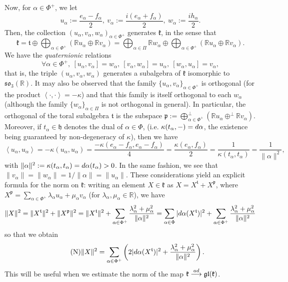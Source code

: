 \documentclass[11pt,twoside]{amsart}
\makeatletter
\theoremstyle{plain}
\newcommand{\R}{{\mathbb R}}
\newcommand{\longto}{\longrightarrow}
\newcommand{\opnorm}{\@ifstar\@opnorms\@opnorm}
\newcommand{\@opnorms}[1]{%
  \left|\mkern-1.5mu\left|\mkern-1.5mu\left|
   #1
  \right|\mkern-1.5mu\right|\mkern-1.5mu\right|
}
\newcommand{\@opnorm}[2][]{%
  \mathopen{#1|\mkern-1.5mu#1|\mkern-1.5mu#1|}
  #2
  \mathclose{#1|\mkern-1.5mu#1|\mkern-1.5mu#1|}
}
\makeatother
\begin{document}
Now, for $\alpha\in\Phi^+$, we let
\[u_\alpha:=\frac{e_\alpha-f_\alpha}{2},~v_\alpha:=\frac{i(e_\alpha+f_\alpha)}{2},~w_\alpha:=\frac{ih_\alpha}{2}.\]
Then, the collection $(u_\alpha,v_\alpha,w_\alpha)_{\alpha\in\Phi^+}$ generates $\mathfrak{k}$, in the sense that
\[\mathfrak{k}=\mathfrak{t}\oplus\bigoplus_{\alpha\in\Phi^+}(\R u_\alpha\oplus\R v_\alpha)=\bigoplus_{\alpha\in\Pi}\R w_\alpha\oplus\bigoplus_{\alpha\in\Phi^+}(\R u_\alpha\oplus\R v_\alpha).\]
We have the \textit{quaternionic} relations
\[\forall \alpha\in\Phi^+,~[u_\alpha,v_\alpha]=w_\alpha,~[v_\alpha,w_\alpha]=u_\alpha,~[w_\alpha,u_\alpha]=v_\alpha,\]
that is, the triple $(u_\alpha,v_\alpha,w_\alpha)$ generates a subalgebra of $\mathfrak{k}$ isomorphic to $\mathfrak{so}_3(\R)$. It may also be observed that the family $\{u_\alpha,v_\alpha\}_{\alpha\in\Phi^+}$ is orthogonal (for the product $\left<\cdot,\cdot\right>=-\kappa$) and that this family is itself orthogonal to each $w_\alpha$ (although the family $\{w_\alpha\}_{\alpha\in\Pi}$ is not orthogonal in general). In particular, the orthogonal of the toral subalgebra $\mathfrak{t}$ is the subspace $\mathfrak{p}:=\bigoplus^{\perp}_{\alpha\in\Phi^+}(\R u_\alpha \oplus^\perp\R v_\alpha)$. Moreover, if $t_\alpha\in\mathfrak{h}$ denotes the dual of $\alpha\in\Phi$, (i.e. $\kappa(t_\alpha,-)={\rm d}\alpha$, the existence being guaranteed by non-degeneracy of $\kappa$), then we have 
\[\left<u_\alpha,u_\alpha\right>=-\kappa(u_\alpha,u_\alpha)=\frac{-\kappa(e_\alpha-f_\alpha,e_\alpha-f_\alpha)}{4}=\frac{\kappa(e_\alpha,f_\alpha)}{2}=\frac{1}{\kappa(t_\alpha,t_\alpha)}=\frac{1}{\|\alpha\|^2},\]
with $\|\alpha\|^2:=\kappa(t_\alpha,t_\alpha)={\rm d}\alpha(t_\alpha)>0$. In the same fashion, we see that $\|v_\alpha\|=\|w_\alpha\|=1/\|\alpha\|=\|u_\alpha\|$. These considerations yield an explicit formula for the norm on $\mathfrak{k}$: writing an element $X\in\mathfrak{k}$ as $X=X^\mathfrak{t}+X^\mathfrak{p}$, where $X^\mathfrak{p}=\sum_{\alpha\in\Phi^+}\lambda_\alpha u_\alpha+\mu_\alpha v_\alpha$ (for $\lambda_\alpha,\mu_\alpha\in\R$), we have
\[\|X\|^2=\|X^\mathfrak{t}\|^2+\|X^\mathfrak{p}\|^2=\|X^\mathfrak{t}\|^2+\sum_{\alpha\in\Phi^+}\frac{\lambda_\alpha^2+\mu_\alpha^2}{\|\alpha\|^2}=\sum_{\alpha\in\Phi}|{\rm d}\alpha(X^\mathfrak{t})|^2+\sum_{\alpha\in\Phi^+}\frac{\lambda_\alpha^2+\mu_\alpha^2}{\|\alpha\|^2}\]
so that we obtain
\begin{equation}\label{norm}\tag{N}
\|X\|^2=\sum_{\alpha\in\Phi^+}\left(2|{\rm d}\alpha(X^\mathfrak{t})|^2+\frac{\lambda_\alpha^2+\mu_\alpha^2}{\|\alpha\|^2}\right).
\end{equation}
This will be useful when we estimate the norm of the map $\mathfrak{k}\stackrel{\tiny{{\rm ad}}}\longto\mathfrak{gl}(\mathfrak{k})$.%
\end{document}
